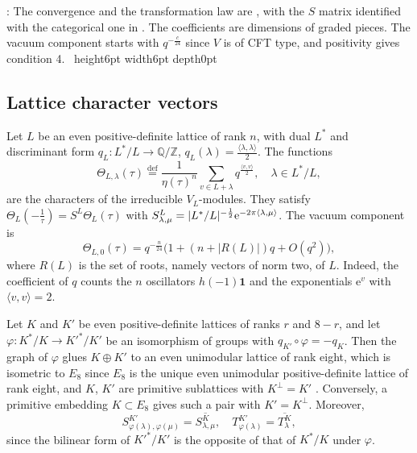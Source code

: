 \documentclass[leqno]{article}
\newcommand{\Z}{\ensuremath{\mathbb{Z}}}
\newcommand{\la}{\langle}
\newcommand{\ra}{\rangle}
\newcommand{\qed}{\hfill \vrule height6pt  width6pt depth0pt}
\newcommand{\co}{\colon}
\newcommand{\ovl}{\overline}
\let\i\relax
\newcommand{\i}{\mathrm{i}}
\newcommand{\ov}{\overset}
\newcommand{\e}{\mathrm{e}}
\newenvironment{proof}[1][]{\noindent {\it Proof #1} : }{\hbox{~}\qed
\smallskip
}
\numberwithin{equation}{section}
\begin{document}
\begin{proof}
The convergence and the transformation law are \cite{Zhu96}, with the $S$ matrix identified with the categorical one in \cite{Hua08}. The coefficients are dimensions of graded pieces. The vacuum component starts with $q^{-\frac{c}{24}}$ since $V$ is of CFT type, and positivity gives condition 4.
\end{proof}

\subsection{Lattice character vectors}

Let $L$ be an even positive-definite lattice of rank $n$, with dual $L^*$ and discriminant form $q_L \co L^*/L \to \mathbb{Q}/\Z$, $q_L(\lambda) = \frac{\la\lambda,\lambda\ra}{2}$. The functions
\begin{equation}
\label{eq:lattice-characters}
\Theta_{L,\lambda}(\tau) \ov{\mathrm{def}}{=} \frac{1}{\eta(\tau)^n}\sum_{v \in L+\lambda}q^{\frac{\la v,v\ra}{2}},\quad \lambda \in L^*/L,
\end{equation}
are the characters of the irreducible $V_L$-modules. They satisfy $\Theta_L(-\frac{1}{\tau}) = S^L\Theta_L(\tau)$ with $S^L_{\lambda,\mu} = |L^*/L|^{-\frac12}\e^{-2\pi\i\la\lambda,\mu\ra}$. The vacuum component is
\begin{equation}
\label{eq:lattice-vacuum}
\Theta_{L,0}(\tau) = q^{-\frac{n}{24}}\big(1+(n+|R(L)|)q+O(q^2)\big),
\end{equation}
where $R(L)$ is the set of roots, namely vectors of norm two, of $L$. Indeed, the coefficient of $q$ counts the $n$ oscillators $h(-1)\mathbf 1$ and the exponentials $\e^{v}$ with $\la v,v\ra = 2$.

Let $K$ and $K'$ be even positive-definite lattices of ranks $r$ and $8-r$, and let $\varphi \co K^*/K \to K'^*/K'$ be an isomorphism of groups with $q_{K'} \circ \varphi = -q_K$. Then the graph of $\varphi$ glues $K \oplus K'$ to an even unimodular lattice of rank eight, which is isometric to $E_8$ since $E_8$ is the unique even unimodular positive-definite lattice of rank eight, and $K$, $K'$ are primitive sublattices with $K^\perp = K'$ \cite[Propositions 1.4.1 and 1.6.1]{Nik80}. Conversely, a primitive embedding $K \subset E_8$ gives such a pair with $K' = K^\perp$. Moreover,
\begin{equation}
\label{eq:conjugate-S}
S^{K'}_{\varphi(\lambda),\varphi(\mu)} = \ovl{S^K_{\lambda,\mu}},\quad T^{K'}_{\varphi(\lambda)} = \ovl{T^K_\lambda},
\end{equation}
since the bilinear form of $K'^*/K'$ is the opposite of that of $K^*/K$ under $\varphi$.
\end{document}
